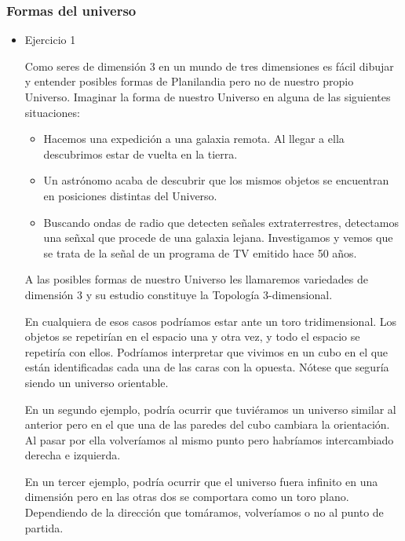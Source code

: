 \documentclass[11pt]{article}
\begin{document}
\subsubsection*{Formas del universo}
\label{sec-5-3-1}
\begin{itemize}
\item Ejercicio 1
\label{sec-5-3-1-1}
\begin{statement}
Como seres de dimensión 3 en un mundo de tres dimensiones es fácil
dibujar y entender posibles formas de Planilandia pero no de nuestro
propio Universo. Imaginar la forma de nuestro Universo en alguna de
las siguientes situaciones:

\begin{itemize}
\item Hacemos una expedición a una galaxia remota. Al llegar a ella
descubrimos estar de vuelta en la tierra.

\item Un astrónomo acaba de descubrir que los mismos objetos se
encuentran en posiciones distintas del Universo.

\item Buscando ondas de radio que detecten señales extraterrestres,
detectamos una señxal que procede de una galaxia lejana.
Investigamos y vemos que se trata de la señal de un programa de TV
emitido hace 50 años.
\end{itemize}

A las posibles formas de nuestro Universo les llamaremos
variedades de dimensión 3 y su estudio constituye la Topología
3-dimensional.
\end{statement}

En cualquiera de esos casos podríamos estar ante un toro tridimensional.
Los objetos se repetirían en el espacio una y otra vez, y todo el espacio
se repetiría con ellos. Podríamos interpretar que vivimos en un cubo en el
que están identificadas cada una de las caras con la opuesta. Nótese que
seguría siendo un universo orientable.

En un segundo ejemplo, podría ocurrir que tuviéramos un universo similar
al anterior pero en el que una de las paredes del cubo cambiara la 
orientación. Al pasar por ella volveríamos al mismo punto pero habríamos
intercambiado derecha e izquierda.

En un tercer ejemplo, podría ocurrir que el universo fuera infinito en
una dimensión pero en las otras dos se comportara como un toro plano.
Dependiendo de la dirección que tomáramos, volveríamos o no al punto
de partida.


\end{itemize}
\end{document}
